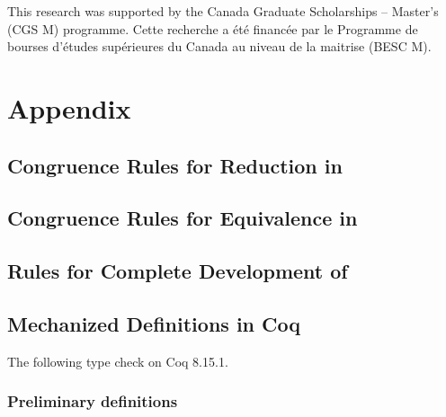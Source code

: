 \documentclass[acmsmall,review,anonymous]{acmart}\settopmatter{printfolios=true,printccs=false,printacmref=false}
\begin{document}
\begin{acks}
This research was supported by the Canada Graduate Scholarships -- Master’s (CGS M) programme.
Cette recherche a \'et\'e financ\'ee par le Programme de bourses d'\'etudes sup\'erieures
du Canada au niveau de la maitrise (BESC M).
\end{acks}



\appendix
\section{Appendix}




\allowdisplaybreaks

\subsection{Congruence Rules for Reduction in \lang} \label{app:cong:red}


\subsection{Congruence Rules for Equivalence in \CICE} \label{app:cong:equiv}


\subsection{Rules for Complete Development of \lang} \label{app:develop}


\setmonofont{iosevka.ttc}

\subsection{Mechanized \CICE Definitions in Coq}

The following type check on Coq 8.15.1.

\subsubsection{Preliminary definitions} \label{app:mechanization:coq:prelim}
\end{document}
